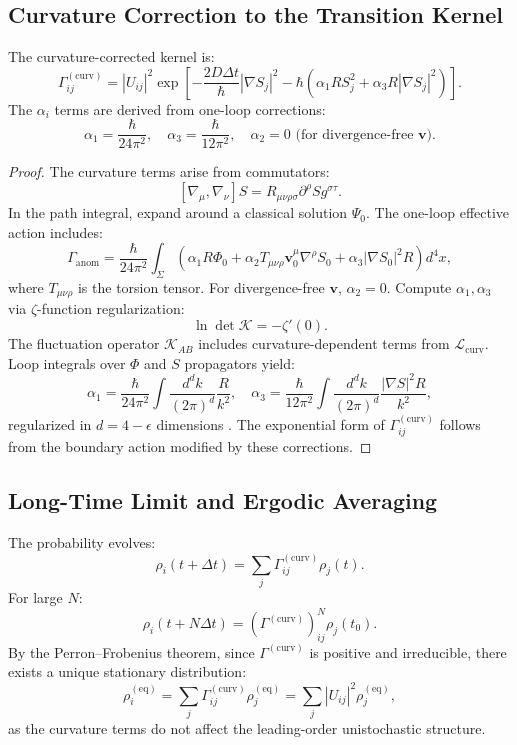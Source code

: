 \documentclass[12pt]{article}
\begin{document}
\subsection{Curvature Correction to the Transition Kernel}

The curvature-corrected kernel is:
\[
\Gamma_{ij}^{(\mathrm{curv})} = |U_{ij}|^2 \exp\left[ -\frac{2 D \Delta t}{\hbar} |\nabla S_j|^2 - \hbar \left( \alpha_1 R S_j^2 + \alpha_3 R |\nabla S_j|^2 \right) \right].
\]
The \(\alpha_i\) terms are derived from one-loop corrections:
\[
\alpha_1 = \frac{\hbar}{24 \pi^2}, \quad \alpha_3 = \frac{\hbar}{12 \pi^2}, \quad \alpha_2 = 0 \text{ (for divergence-free } \mathbf{v}\text{)}.
\]

\begin{proof}
The curvature terms arise from commutators:
\[
[\nabla_\mu, \nabla_\nu] S = R_{\mu\nu\rho\sigma} \partial^\rho S g^{\sigma\tau}.
\]
In the path integral, expand around a classical solution \(\Psi_0\). The one-loop effective action includes:
\[
\Gamma_{\mathrm{anom}} = \frac{\hbar}{24 \pi^2} \int_\Sigma \left( \alpha_1 R \Phi_0 + \alpha_2 T_{\mu\nu\rho} \mathbf{v}_0^\mu \nabla^\rho S_0 + \alpha_3 |\nabla S_0|^2 R \right) d^4x,
\]
where \(T_{\mu\nu\rho}\) is the torsion tensor. For divergence-free \(\mathbf{v}\), \(\alpha_2 = 0\). Compute \(\alpha_1, \alpha_3\) via \(\zeta\)-function regularization:
\[
\ln \det \mathcal{K} = -\zeta'(0).
\]
The fluctuation operator \(\mathcal{K}_{AB}\) includes curvature-dependent terms from \(\mathcal{L}_{\text{curv}}\). Loop integrals over \(\Phi\) and \(S\) propagators yield:
\[
\alpha_1 = \frac{\hbar}{24 \pi^2} \int \frac{d^d k}{(2\pi)^d} \frac{R}{k^2}, \quad \alpha_3 = \frac{\hbar}{12 \pi^2} \int \frac{d^d k}{(2\pi)^d} \frac{|\nabla S|^2 R}{k^2},
\]
regularized in \(d = 4 - \epsilon\) dimensions \cite{Pantev2013}. The exponential form of \(\Gamma_{ij}^{(\mathrm{curv})}\) follows from the boundary action modified by these corrections.
\end{proof}

\subsection{Long-Time Limit and Ergodic Averaging}

The probability evolves:
\[
\rho_i(t + \Delta t) = \sum_j \Gamma_{ij}^{(\mathrm{curv})} \rho_j(t).
\]
For large \(N\):
\[
\rho_i(t + N \Delta t) = \left( \Gamma^{(\mathrm{curv})} \right)^N_{ij} \rho_j(t_0).
\]
By the Perron–Frobenius theorem, since \(\Gamma^{(\mathrm{curv})}\) is positive and irreducible, there exists a unique stationary distribution:
\[
\rho_i^{(\mathrm{eq})} = \sum_j \Gamma_{ij}^{(\mathrm{curv})} \rho_j^{(\mathrm{eq})} = \sum_j |U_{ij}|^2 \rho_j^{(\mathrm{eq})},
\]
as the curvature terms do not affect the leading-order unistochastic structure.
\end{document}

